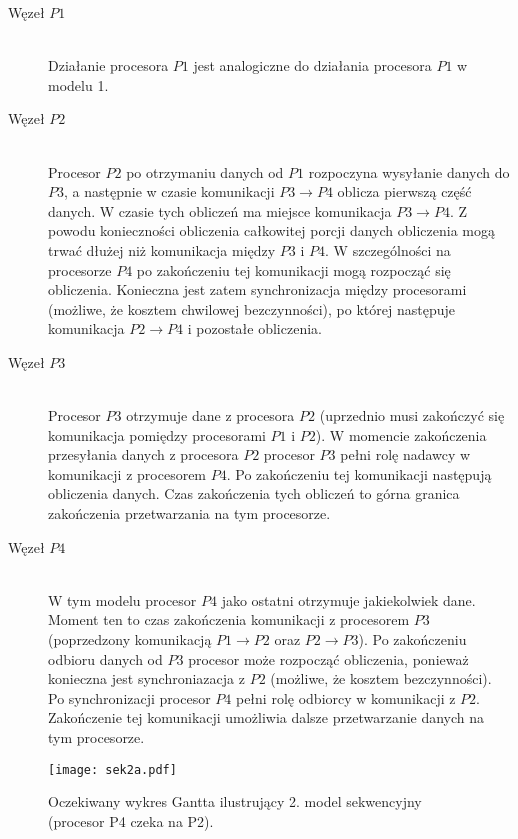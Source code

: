 \begin{description}

\item[Węzeł $P1$] \hfill \\

Działanie procesora $P1$ jest analogiczne do działania procesora $P1$ w modelu 1.

\item[Węzeł $P2$] \hfill \\

Procesor $P2$ po otrzymaniu danych od $P1$ rozpoczyna wysyłanie danych do $P3$, a następnie w czasie komunikacji $P3 \to P4$ oblicza pierwszą część danych.
W czasie tych obliczeń ma miejsce komunikacja $P3 \to P4$. Z powodu konieczności obliczenia całkowitej porcji danych obliczenia mogą trwać dłużej niż komunikacja
między $P3$ i $P4$. W szczególności na procesorze $P4$ po zakończeniu tej komunikacji mogą rozpocząć się obliczenia.
Konieczna jest zatem synchronizacja między procesorami (możliwe, że kosztem chwilowej bezczynności), po której następuje komunikacja $P2 \to P4$ i pozostałe obliczenia.

\item[Węzeł $P3$] \hfill \\

Procesor $P3$ otrzymuje dane z procesora $P2$ (uprzednio musi zakończyć się komunikacja pomiędzy procesorami $P1$ i $P2$).
W momencie zakończenia przesyłania danych z procesora $P2$ procesor $P3$ pełni rolę nadawcy w komunikacji z procesorem $P4$.
Po zakończeniu tej komunikacji następują obliczenia danych. Czas zakończenia tych obliczeń to górna granica zakończenia przetwarzania na tym procesorze.

\item[Węzeł $P4$] \hfill \\

W tym modelu procesor $P4$ jako ostatni otrzymuje jakiekolwiek dane. Moment ten to czas zakończenia komunikacji z procesorem $P3$ (poprzedzony komunikacją $P1 \to P2$ oraz $P2 \to P3$). Po zakończeniu odbioru danych od $P3$ procesor może rozpocząć obliczenia, ponieważ konieczna jest synchroniazacja z $P2$ (możliwe, że kosztem bezczynności). Po synchronizacji procesor $P4$ pełni rolę odbiorcy w komunikacji z $P2$. Zakończenie tej komunikacji umożliwia dalsze przetwarzanie danych na tym procesorze. 

\end{description}

\begin{figure}[H]
\centering
\texttt{[image: sek2a.pdf]}
\caption{Oczekiwany wykres Gantta ilustrujący 2. model sekwencyjny (procesor P4 czeka na P2).}
\label{fig:seq2a}
\end{figure}

